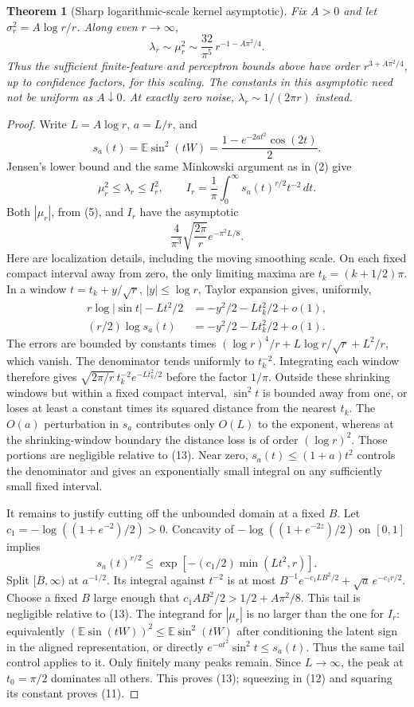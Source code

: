 \documentclass[11pt]{article}
\newtheorem{theorem}{Theorem}\newtheorem{lemma}[theorem]{Lemma}
\newcommand{\E}{\mathbb E}\newcommand{\R}{\mathbb R}
\begin{document}
\begin{theorem}[Sharp logarithmic-scale kernel asymptotic]
Fix $A>0$ and let $\sigma_r^2=A\log r/r$. Along even $r\to\infty$,
\[
 \lambda_r\sim\mu_r^2\sim
                  \frac{32}{\pi^5}\,r^{-1-A\pi^2/4}.    \tag{11}
\]
Thus the sufficient finite-feature and perceptron bounds above have
order $r^{3+A\pi^2/4}$, up to confidence factors, for this scaling.
The constants in this asymptotic need not be uniform as $A\downarrow0$.
At exactly zero noise, $\lambda_r\sim1/(2\pi r)$ instead.
\end{theorem}
\begin{proof}
Write $L=A\log r$, $a=L/r$, and
\[
 s_a(t)=\E\sin^2(tW)=\frac{1-e^{-2at^2}\cos(2t)}2.
\]
Jensen's lower bound and the same Minkowski argument as in (2) give
\[
 \mu_r^2\le\lambda_r\le I_r^2,\qquad
 I_r=\frac1\pi\int_0^\infty s_a(t)^{r/2}t^{-2}\,dt.
 \tag{12}
\]
Both $|\mu_r|$, from (5), and $I_r$ have the asymptotic
\[
 \frac4{\pi^3}\sqrt{\frac{2\pi}{r}}
                            e^{-\pi^2L/8}.             \tag{13}
\]
Here are localization details, including the moving smoothing scale.
On each fixed compact interval away from zero, the only limiting maxima
are $t_k=(k+1/2)\pi$. In a window
$t=t_k+y/\sqrt r$, $|y|\le\log r$, Taylor expansion gives, uniformly,
\begin{align*}
 r\log|\sin t|-Lt^2/2
             &=-y^2/2-Lt_k^2/2+o(1),\\
 (r/2)\log s_a(t)
             &=-y^2/2-Lt_k^2/2+o(1).
\end{align*}
The errors are bounded by constants times
$(\log r)^4/r+L\log r/\sqrt r+L^2/r$, which vanish.
The denominator tends uniformly to $t_k^{-2}$.
Integrating each window therefore gives
$\sqrt{2\pi/r}\,t_k^{-2}e^{-Lt_k^2/2}$ before the factor $1/\pi$.
Outside these shrinking windows but within a fixed compact interval,
$\sin^2t$ is bounded away from one, or loses at least a constant times
its squared distance from the nearest $t_k$.
The $O(a)$ perturbation in $s_a$ contributes only $O(L)$ to the exponent,
whereas at the shrinking-window boundary the distance loss is of order
$(\log r)^2$. Those portions are negligible relative to (13).
Near zero, $s_a(t)\le(1+a)t^2$ controls the denominator and gives an
exponentially small integral on any sufficiently small fixed interval.

It remains to justify cutting off the unbounded domain at a fixed $B$.
Let $c_1=-\log((1+e^{-2})/2)>0$. Concavity of
$-\log((1+e^{-2z})/2)$ on $[0,1]$ implies
\[
 s_a(t)^{r/2}\le
       \exp[-(c_1/2)\min(Lt^2,r)].
\]
Split $[B,\infty)$ at $a^{-1/2}$. Its integral against $t^{-2}$
is at most
$B^{-1}e^{-c_1LB^2/2}+\sqrt a\,e^{-c_1r/2}$.
Choose a fixed $B$ large enough that
$c_1AB^2/2>1/2+A\pi^2/8$.
This tail is negligible relative to (13). The integrand for $|\mu_r|$
is no larger than the one for $I_r$: equivalently
$(\E\sin(tW))^2\le\E\sin^2(tW)$ after conditioning the latent sign
in the aligned representation, or directly
$e^{-at^2}\sin^2t\le s_a(t)$.
Thus the same tail control applies to it.
Only finitely many peaks remain. Since $L\to\infty$, the peak at
$t_0=\pi/2$ dominates all others. This proves (13); squeezing in (12)
and squaring its constant proves (11).
\end{proof}
\end{document}
